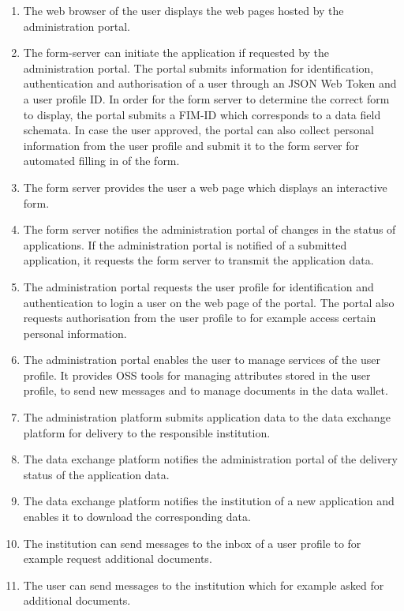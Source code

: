 \documentclass[
     12pt,         %
     a4paper,      %
     BCOR=10mm,version=first,     %
     DIV=14,version=first,        %
     ]{scrreprt}
\begin{document}
\begin{enumerate}

    \item The web browser of the user displays the web pages hosted by the administration portal.

    \item The form-server can initiate the application if requested by the administration portal. The portal submits information for identification, authentication and authorisation of a user through an JSON Web Token and a user profile ID. In order for the form server to determine the correct form to display, the portal submits a FIM-ID which corresponds to a data field schemata. In case the user approved, the portal can also collect personal information from the user profile and submit it to the form server for automated filling in of the form.
    
    \item The form server provides the user a web page which displays an interactive form.
    
    \item The form server notifies the administration portal of changes in the status of applications. If the administration portal is notified of a submitted application, it requests the form server to transmit the application data.
    
    \item The administration portal requests the user profile for identification and authentication to login a user on the web page of the portal. The portal also requests authorisation from the user profile to for example access certain personal information.
    
    \item The administration portal enables the user to manage services of the user profile. It provides OSS tools for managing attributes stored in the user profile, to send new messages and to manage documents in the data wallet.
    
    \item The administration platform submits application data to the data exchange platform for delivery to the responsible institution.
    
    \item The data exchange platform notifies the administration portal of the delivery status of the application data.
    
    \item The data exchange platform notifies the institution of a new application and enables it to download the corresponding data.
    
    \item The institution can send messages to the inbox of a user profile to for example request additional documents.
    
    \item The user can send messages to the institution which for example asked for additional documents.
    
\end{enumerate}
    
\end{document}
